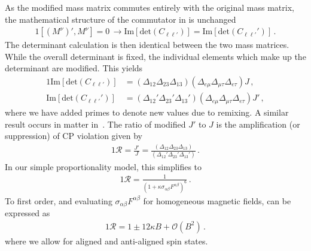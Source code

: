 As the modified mass matrix commutes entirely with the original mass matrix, the mathematical structure of the commutator in  is unchanged
\begin{alignat}{1}
	\label{commutes:1} \left[(M^{\nu})',M^{\nu}\right]=0\,\rightarrow
    \mathrm{Im}[\mathrm{det}(C_{\ell\ell'})] = \mathrm{Im}[\mathrm{det}(C_{\ell\ell'}')]\,.
\end{alignat}
The determinant calculation is then identical between the two mass matrices. While the overall determinant is fixed, the individual elements which make up the determinant are modified. This yields
\begin{alignat}{1}
	\label{det:0} \mathrm{Im}\left[\mathrm{det}(C_{\ell\ell'})\right] &= \left(\Delta_{12}\Delta_{23}\Delta_{13}\right)\left(\Delta_{e\mu}\Delta_{\mu\tau}\Delta_{e\tau}\right)J\,,\\
	\label{det:2} \mathrm{Im}\left[\mathrm{det}(C_{\ell\ell'}')\right] &= \left(\Delta_{12}'\Delta_{23}'\Delta_{13}'\right)\left(\Delta_{e\mu}\Delta_{\mu\tau}\Delta_{e\tau}\right)J'\,,
\end{alignat}
where we have added primes to denote new values due to remixing. A similar result occurs in matter in~\cite{Harrison:1999df}. The ratio of modified $J'$ to $J$ is the amplification (or suppression) of CP violation given by
\begin{alignat}{1}
	\label{ampj:1} \mathcal{R} = \frac{J'}{J} = \frac{\left(\Delta_{12}\Delta_{23}\Delta_{13}\right)}{\left(\Delta_{12}'\Delta_{23}'\Delta_{13}'\right)}\,.
\end{alignat}
In our simple proportionality model, this simplifies to
\begin{alignat}{1}
	\label{ampj:2} \mathcal{R} = \frac{1}{\left(1+\kappa\sigma_{\alpha\beta}F^{\alpha\beta}\right)^{6}}\,.
\end{alignat}
To first order, and evaluating $\sigma_{\alpha\beta}F^{\alpha\beta}$ for homogeneous magnetic fields,  can be expressed as
\begin{alignat}{1}
	\label{amp:3} \mathcal{R} = 1\pm12\kappa B+\mathcal{O}(B^{2})\,.
\end{alignat}
where we allow for aligned and anti-aligned spin states.

